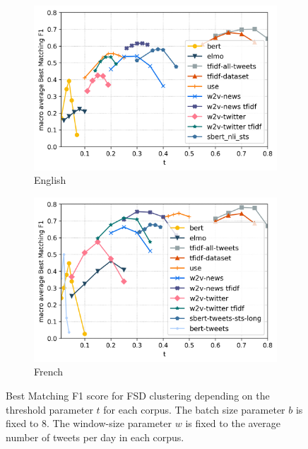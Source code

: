 \begin{figure}
\centering
\begin{subfigure}{.5\textwidth}
  \centering
  \includegraphics[width=1\linewidth]{figures/graph_en_FSD.png}
  \caption{English}
  \label{fig: graph_FSD_en}
\end{subfigure}%
\begin{subfigure}{.5\textwidth}
  \centering
  \includegraphics[width=1\linewidth]{figures/graph_fr_FSD.png}
  \caption{French}
  \label{fig: graph_FSD_fr}
\end{subfigure}
\caption[Best Matching F1 score for FSD clustering depending on the threshold parameter $t$ for each corpus]{Best Matching F1 score for FSD clustering depending on the
threshold parameter $t$ for each corpus. The batch size parameter $b$ is fixed to 8. The window-size parameter $w$ is fixed to the average number of tweets per day in each corpus.}
\label{fig: graph_FSD}
\end{figure}


